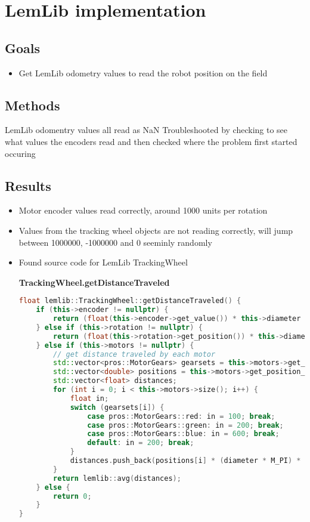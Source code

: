\section{LemLib implementation}

\subsection{Goals}
\begin{itemize}
    \item Get LemLib odometry values to read the robot position on the field
\end{itemize}

\subsection{Methods}
LemLib odomentry values all read as NaN
Troubleshooted by checking to see what values the encoders read and then checked where the problem first started occuring

\subsection{Results}
\begin{itemize}
    \item Motor encoder values read correctly, around 1000 units per rotation
    \item Values from the tracking wheel objects are not reading correctly, will jump between 1000000, -1000000 and 0 seeminly randomly
    \item Found source code for LemLib TrackingWheel
    
\textbf{TrackingWheel.getDistanceTraveled}
\begin{lstlisting}[language=c++]
float lemlib::TrackingWheel::getDistanceTraveled() {
    if (this->encoder != nullptr) {
        return (float(this->encoder->get_value()) * this->diameter * M_PI / 360) / this->gearRatio;
    } else if (this->rotation != nullptr) {
        return (float(this->rotation->get_position()) * this->diameter * M_PI / 36000) / this->gearRatio;
    } else if (this->motors != nullptr) {
        // get distance traveled by each motor
        std::vector<pros::MotorGears> gearsets = this->motors->get_gearing_all();
        std::vector<double> positions = this->motors->get_position_all();
        std::vector<float> distances;
        for (int i = 0; i < this->motors->size(); i++) {
            float in;
            switch (gearsets[i]) {
                case pros::MotorGears::red: in = 100; break;
                case pros::MotorGears::green: in = 200; break;
                case pros::MotorGears::blue: in = 600; break;
                default: in = 200; break;
            }
            distances.push_back(positions[i] * (diameter * M_PI) * (rpm / in));
        }
        return lemlib::avg(distances);
    } else {
        return 0;
    }
}
\end{lstlisting}
\end{itemize}

